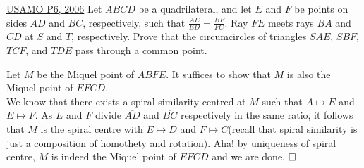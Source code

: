 \begin{problem}{5}{\href{https://artofproblemsolving.com/community/q2h84559p35507946}{USAMO P6, 2006}} 
	Let $ABCD$ be a quadrilateral, and let $E$ and $F$ be points on sides $AD$ and $BC$, respectively, such that $\frac{AE}{ED} = \frac{BF}{FC}$. Ray $FE$ meets rays $BA$ and $CD$ at $S$ and $T$, respectively. Prove that the circumcircles of triangles $SAE$, $SBF$, $TCF$, and $TDE$ pass through a common point.
	\begin{solution} Let $M$ be the Miquel point of $ABFE$. It suffices to show that $M$ is also the Miquel point of $EFCD$.\\
We know that there exists a spiral similarity centred at $M$ such that $A\mapsto E$ and $E\mapsto F$. As $E$ and $F$ divide $\overline{AD}$ and $\overline{BC}$ respectively in the same ratio, it follows that $M$ is the spiral centre with $E\mapsto D$ and $F\mapsto C$(recall that spiral similarity is just a composition of homothety and rotation). Aha! by uniqueness of spiral centre, $M$ is indeed the Miquel point of $EFCD$ and we are done. $\qedwhite$
	\end{solution}
\end{problem}

